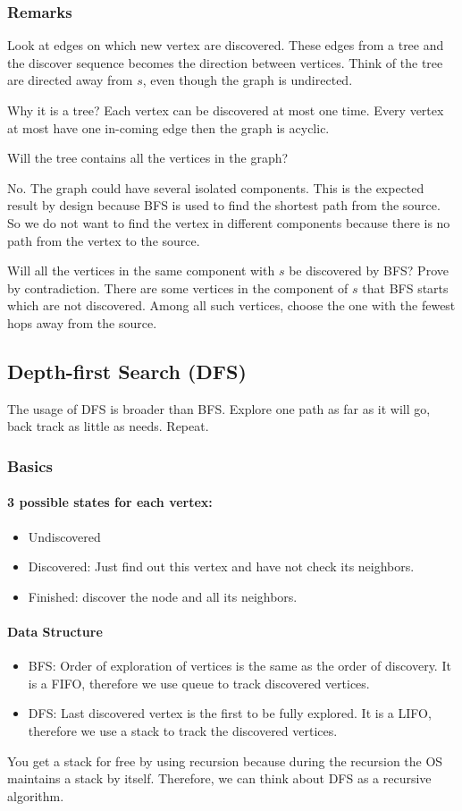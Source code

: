 \documentclass[en,hazy,blue,screen,14pt]{elegantnote}
\begin{document}
\subsubsection{Remarks}
Look at edges on which new vertex are discovered. These edges from a tree and 
the discover sequence becomes the direction between vertices. Think 
of the tree are directed away from $s$, even though the graph is undirected.

Why it is a tree? Each vertex can be discovered at most one time. Every 
vertex at most have one in-coming edge then the graph is acyclic.

Will the tree contains all the vertices in the graph? 

No. The graph could have 
several isolated components. This is the expected result by design because BFS 
is used to find the shortest path from the source. So we do not want to find 
the vertex in different components because there is no path from the vertex to 
the source.

Will all the vertices in the same component with $s$ be discovered by BFS?
Prove by contradiction. There are some vertices in the component of $s$ that 
BFS starts which are not discovered. Among all such vertices, choose the one 
with the fewest hops away from the source.
\subsection{Depth-first Search (DFS)}
The usage of DFS is broader than BFS. Explore one path as far as it will go, 
back track as little as needs. Repeat.

\subsubsection{Basics}

\paragraph{3 possible states for each vertex:}
\begin{itemize}
 \item Undiscovered
 \item Discovered: Just find out this vertex and have not check its neighbors.
 \item Finished: discover the node and all its neighbors.
\end{itemize}
\paragraph{Data Structure}
\begin{itemize}
\item BFS: Order of exploration of vertices is the same as the order of 
discovery. It is a FIFO, therefore we use queue to track discovered vertices.
\item DFS: Last discovered vertex is the first to be fully explored. It is a 
LIFO, therefore we use a stack to track the discovered vertices.
\end{itemize}
You get a stack for free by using recursion because during the recursion the 
OS maintains a stack by itself. Therefore, we can think about DFS as a 
recursive algorithm.
\end{document}
